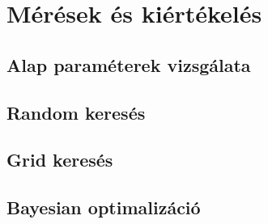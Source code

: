 \chapter{Mérések és kiértékelés}

\section{Alap paraméterek vizsgálata}

\section{Random keresés}

\section{Grid keresés}

\section{Bayesian optimalizáció}